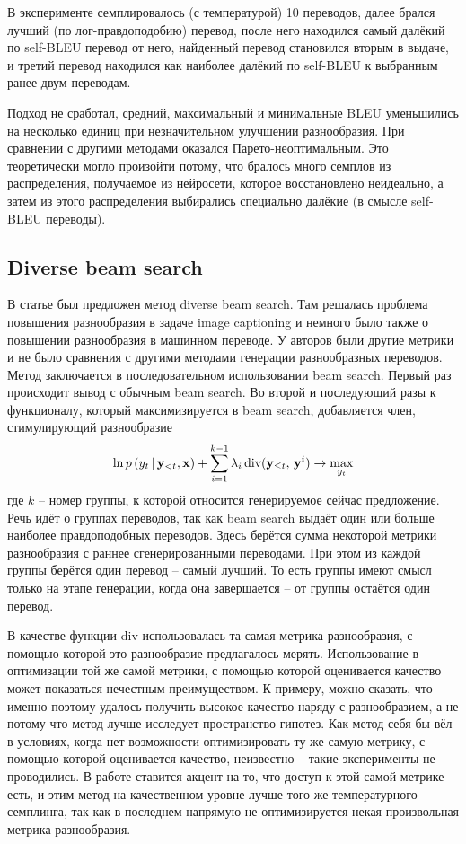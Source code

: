 \documentclass[a4paper, 12pt]{extarticle}
\begin{document}
    В эксперименте семплировалось (с температурой) 10 переводов, далее брался лучший (по лог-правдоподобию) перевод, после него находился самый далёкий по self-BLEU перевод от него, найденный перевод становился вторым в выдаче, и третий перевод находился как наиболее далёкий по self-BLEU к выбранным ранее двум переводам.

    Подход не сработал, средний, максимальный и минимальные BLEU уменьшились на несколько единиц при незначительном улучшении разнообразия. При сравнении с другими методами оказался Парето-неоптимальным. Это теоретически могло произойти потому, что бралось много семплов из распределения, получаемое из нейросети, которое восстановлено неидеально, а затем из этого распределения выбирались специально далёкие (в смысле self-BLEU переводы).

\subsection{Diverse beam search}
В статье \cite{diverse-beam} был предложен метод diverse beam search. Там решалась проблема повышения разнообразия в задаче image captioning и немного было также о повышении разнообразия в машинном переводе. У авторов были другие метрики и не было сравнения с другими методами генерации разнообразных переводов. Метод заключается в последовательном использовании beam search. Первый раз происходит вывод с обычным beam search. Во второй и последующий разы к функционалу, который максимизируется в beam search, добавляется член, стимулирующий разнообразие $$\ln p \, (y_t \, | \, \bold{y}_{<t}, \bold{x}) + \sum_{i=1}^{k - 1} \lambda_i \, \textrm{div}(\bold{y}_{\leq t}, \, \bold{y}^i) \rightarrow \max\limits_{y_t}$$ где $k$ -- номер группы, к которой относится генерируемое сейчас предложение. Речь идёт о группах переводов, так как beam search выдаёт один или больше наиболее правдоподобных переводов. Здесь берётся сумма некоторой метрики разнообразия с раннее сгенерированными переводами. При этом из каждой группы берётся один перевод -- самый лучший. То есть группы имеют смысл только на этапе генерации, когда она завершается -- от группы остаётся один перевод.

    В качестве функции div использовалась та самая метрика разнообразия, с помощью которой это разнообразие предлагалось мерять. Использование в оптимизации той же самой метрики, с помощью которой оценивается качество может показаться нечестным преимуществом. К примеру, можно сказать, что именно поэтому удалось получить высокое качество наряду с разнообразием, а не потому что метод лучше исследует пространство гипотез. Как метод себя бы вёл в условиях, когда нет возможности оптимизировать ту же самую метрику, с помощью которой оценивается качество, неизвестно -- такие эксперименты не проводились. В работе ставится акцент на то, что доступ к этой самой метрике есть, и этим метод на качественном уровне лучше того же температурного семплинга, так как в последнем напрямую не оптимизируется некая произвольная метрика разнообразия.
\end{document}
